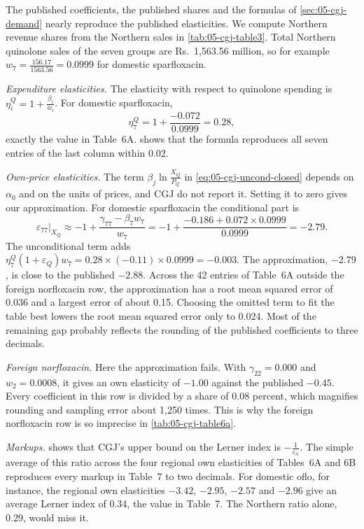 \begin{example}\label{ex:05-cgj-elasticity-check}
The published coefficients, the published shares and the formulas of \cref{sec:05-cgj-demand} nearly reproduce the
published elasticities. We compute Northern revenue shares from the Northern sales in \cref{tab:05-cgj-table3}. Total
Northern quinolone sales of the seven groups are Rs.~1,563.56 million, so for example $w_7 = \frac{156.17}{1563.56} =
0.0999$ for domestic sparfloxacin.

\emph{Expenditure elasticities.} The elasticity with respect to quinolone spending is $\eta_i^Q = 1 +
\frac{\beta_i}{w_i}$. For domestic sparfloxacin,
\begin{equation*}
\eta_7^Q = 1 + \frac{-0.072}{0.0999} = 0.28,
\end{equation*}
exactly the value in Table~6A.  shows that the formula reproduces all seven entries of the
last column within 0.02.

\emph{Own-price elasticities.} The term $\beta_j\ln\frac{X_Q}{P_Q}$ in \eqref{eq:05-cgj-uncond-closed} depends on
$\alpha_0$ and on the units of prices, and CGJ do not report it. Setting it to zero gives our approximation. For
domestic sparfloxacin the conditional part is
\begin{equation*}
\varepsilon_{77}\big|_{X_Q} \approx -1 + \frac{\gamma_{77} - \beta_7w_7}{w_7}
= -1 + \frac{-0.186 + 0.072 \times 0.0999}{0.0999} = -2.79 .
\end{equation*}
The unconditional term adds $\eta_7^Q(1 + \varepsilon_Q)w_7 = 0.28 \times (-0.11) \times 0.0999 = -0.003$. The
approximation, $-2.79$, is close to the published $-2.88$. Across the 42 entries of Table~6A outside the foreign
norfloxacin row, the approximation has a root mean squared error of 0.036 and a largest error of about 0.15.
Choosing the omitted term to fit the table best lowers the root mean squared error only to 0.024. Most of the
remaining gap probably reflects the rounding of the published coefficients to three decimals.

\emph{Foreign norfloxacin.} Here the approximation fails. With $\gamma_{22} = 0.000$ and $w_2 = 0.0008$, it gives an
own elasticity of $-1.00$ against the published $-0.45$. Every coefficient in this row is divided by a share of 0.08
percent, which magnifies rounding and sampling error about 1,250 times. This is why the foreign norfloxacin row is so
imprecise in \cref{tab:05-cgj-table6a}.

\emph{Markups.}  shows that CGJ's upper bound on the Lerner index is $-\frac{1}{\varepsilon_{ii}}$.
The simple average of this ratio across the four regional own elasticities of Tables~6A and 6B reproduces every
markup in Table~7 to two decimals. For domestic oflo, for instance, the regional own elasticities $-3.42$, $-2.95$,
$-2.57$ and $-2.96$ give an average Lerner index of 0.34, the value in Table~7. The Northern ratio alone, 0.29, would
miss it.
\end{example}

